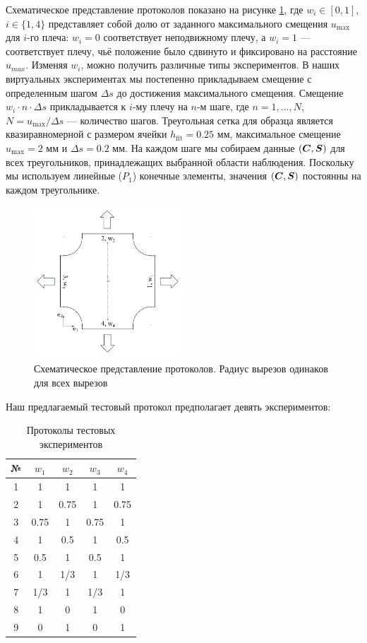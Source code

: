 Схематическое представление протоколов показано на рисунке \ref{fig:malt_displacements}, где $w_i \in [0,1]$, $i \in \{1,4\}$
представляет собой долю от заданного максимального смещения $u_{\max}$ для $i$-го плеча: $w_i = 0$ 
соответствует неподвижному плечу, а $w_i = 1$ — соответствует плечу, чьё положение было сдвинуто и фиксировано на расстояние $u_{max}$. 
Изменяя $w_i$, можно получить различные типы экспериментов. 
В наших виртуальных экспериментах мы постепенно 
прикладываем смещение с определенным шагом $\Delta s$ до достижения максимального смещения. 
Смещение $w_i \cdot n \cdot \Delta s$ прикладывается к $i$-му плечу на $n$-м шаге, где $n = 1, \ldots, N$, 
$N = u_{\max}/\Delta s$ — количество шагов. 
Треугольная сетка для образца является квазиравномерной с размером ячейки $h_{\text{fit}} = 0.25$ мм, максимальное смещение 
$u_{\max} = 2$ мм и $\Delta s = 0.2$ мм. 
На каждом шаге мы собираем данные $(\boldsymbol{C}, \boldsymbol{S})$ для всех треугольников, принадлежащих выбранной области наблюдения. 
Поскольку мы используем линейные ($P_1$) конечные элементы, значения $(\boldsymbol{C}, \boldsymbol{S})$ постоянны на каждом треугольнике.

 \begin{figure}[H]
  \centering
  \includegraphics[width=0.5\textwidth]{img/malt_dirichlet.png}
  \caption{Схематическое представление протоколов. 
  Радиус вырезов одинаков для всех вырезов}
  \label{fig:malt_displacements}
\end{figure}
 
Наш предлагаемый тестовый протокол предполагает девять экспериментов:

\begin{table}[H]
\centering
\caption{Протоколы тестовых экспериментов}
\label{tab:test_protocols}
\begin{tabular}{|c|c|c|c|c|}
\hline
\textbf{№} & $w_1$ & $w_2$ & $w_3$ & $w_4$ \\
\hline
1 & 1 & 1 & 1 & 1 \\
2 & 1 & 0.75 & 1 & 0.75 \\
3 & 0.75 & 1 & 0.75 & 1 \\
4 & 1 & 0.5 & 1 & 0.5 \\
5 & 0.5 & 1 & 0.5 & 1 \\
6 & 1 & 1/3 & 1 & 1/3 \\
7 & 1/3 & 1 & 1/3 & 1 \\
8 & 1 & 0 & 1& 0 \\
9 & 0 & 1 & 0 & 1 \\
\hline
\end{tabular}
\end{table}

